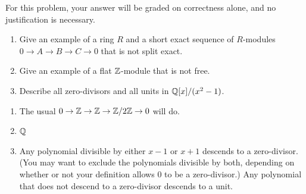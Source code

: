 %
\begin{question}[subtitle = {August 2018 Problem 1, edited},ID=Aug18_1]
For this problem, your answer will be graded on correctness alone, and no justification is necessary.
\begin{enumerate}
    \item Give an example of a ring $R$ and a short exact sequence of $R$-modules $0 \to A \to B \to C \to 0$ that is not split exact.
    \item Give an example of a flat $\mathbb{Z}$-module that is not free.
    \item Describe all zero-divisors and all units in $\mathbb{Q}[x]/(x^2-1)$.
\end{enumerate}
\end{question}
\begin{solution}
\begin{enumerate}
    \item The usual $0 \to \mathbb{Z} \to \mathbb{Z} \to \mathbb{Z}/2\mathbb{Z} \to 0$ will do.
    \item $\mathbb{Q}$
    \item Any polynomial divisible by either $x-1$ or $x+1$ descends to a zero-divisor. (You may want to exclude the polynomials divisible by both, depending on whether or not your definition allows 0 to be a zero-divisor.) Any polynomial that does not descend to a zero-divisor descends to a unit.
\end{enumerate}
\end{solution}

